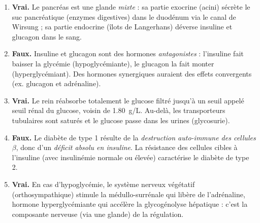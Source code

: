 \documentclass[11pt]{article}
\newcommand{\cle}[1]{{\popxbold\color{popdark}#1}}
\begin{document}
\begin{corrige}
\begin{enumerate}
\item \textbf{Vrai.} Le pancréas est une glande \emph{mixte} : sa partie exocrine (acini) sécrète le suc pancréatique (enzymes digestives) dans le duodénum via le canal de Wirsung ; sa partie endocrine (îlots de Langerhans) déverse insuline et glucagon dans le sang.
\item \textbf{Faux.} Insuline et glucagon sont des hormones \emph{antagonistes} : l'insuline fait baisser la glycémie (hypoglycémiante), le glucagon la fait monter (hyperglycémiant). Des hormones synergiques auraient des effets convergents (ex. glucagon et adrénaline).
\item \textbf{Vrai.} Le rein réabsorbe totalement le glucose filtré jusqu'à un seuil appelé \cle{seuil rénal du glucose}, voisin de \SI{1,80}{g/L}. Au-delà, les transporteurs tubulaires sont saturés et le glucose passe dans les urines (glycosurie).
\item \textbf{Faux.} Le diabète de type 1 résulte de la \emph{destruction auto-immune des cellules $\beta$}, donc d'un \emph{déficit absolu en insuline}. La résistance des cellules cibles à l'insuline (avec insulinémie normale ou élevée) caractérise le diabète de type 2.
\item \textbf{Vrai.} En cas d'hypoglycémie, le système nerveux végétatif (orthosympathique) stimule la médullo-surrénale qui libère de l'\cle{adrénaline}, hormone hyperglycémiante qui accélère la glycogénolyse hépatique : c'est la composante nerveuse (via une glande) de la régulation.
\end{enumerate}
\end{corrige}
\end{document}
